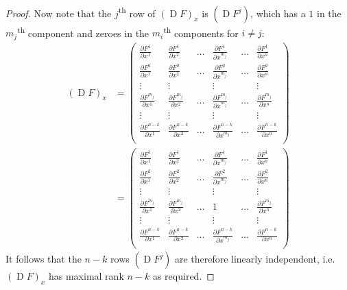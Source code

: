 \documentclass[notoc,notitlepage]{tufte-book}
\DeclareMathOperator{\D}{D}
\begin{document}
\begin{proof}
  Now note that the $j$\textsuperscript{th} row of $(\D F)_x$ is $(\D F^j)$,
  which has a $1$ in the $m_j$\textsuperscript{th} component and zeroes in the
  $m_i$\textsuperscript{th} components for $i \neq j$:
  \begin{align*}
    (\D F)_x &= \begin{pmatrix}
      \frac{\partial F^1}{\partial x^1} & \frac{\partial F^1}{\partial x^2} &
      \hdots & \frac{\partial F^1}{\partial x^{m_j}} & \hdots & \frac{\partial
      F^1}{\partial x^n} \\
      \frac{\partial F^2}{\partial x^1} & \frac{\partial F^2}{\partial x^2} &
      \hdots & \frac{\partial F^2}{\partial x^{m_j}} & \hdots & \frac{\partial
      F^2}{\partial x^n} \\
      \vdots & \vdots & & \vdots & & \vdots \\
      \frac{\partial F^{m_j}}{\partial x^1} & \frac{\partial F^{m_j }}{\partial x^2} &
      \hdots & \frac{\partial F^{m_j}}{\partial x^{m_j}} & \hdots & \frac{\partial
      F^{m_j}}{\partial x^n} \\
      \vdots & \vdots & & \vdots & & \vdots \\
      \frac{\partial F^{n - k}}{\partial x^1} & \frac{\partial F^{n - k }}{\partial x^2} &
      \hdots & \frac{\partial F^{n - k}}{\partial x^{m_j}} & \hdots & \frac{\partial
      F^{n - k}}{\partial x^n} \\
    \end{pmatrix} \\
             &= \begin{pmatrix}
      \frac{\partial F^1}{\partial x^1} & \frac{\partial F^1}{\partial x^2} &
      \hdots & \frac{\partial F^1}{\partial x^{m_j}} & \hdots & \frac{\partial
      F^1}{\partial x^n} \\
      \frac{\partial F^2}{\partial x^1} & \frac{\partial F^2}{\partial x^2} &
      \hdots & \frac{\partial F^2}{\partial x^{m_j}} & \hdots & \frac{\partial
      F^2}{\partial x^n} \\
      \vdots & \vdots & & \vdots & & \vdots \\
      \frac{\partial F^{m_j}}{\partial x^1} & \frac{\partial F^{m_j }}{\partial x^2} &
      \hdots & 1 & \hdots & \frac{\partial
      F^{m_j}}{\partial x^n} \\
      \vdots & \vdots & & \vdots & & \vdots \\
      \frac{\partial F^{n - k}}{\partial x^1} & \frac{\partial F^{n - k }}{\partial x^2} &
      \hdots & \frac{\partial F^{n - k}}{\partial x^{m_j}} & \hdots & \frac{\partial
      F^{n - k}}{\partial x^n} \\
    \end{pmatrix}
  \end{align*}
  It follows that the $n - k$ rows $(\D F^j)$ are therefore linearly
  independent, i.e. $(\D F)_x$ has maximal rank $n - k$ as required.
\end{proof}
\end{document}
